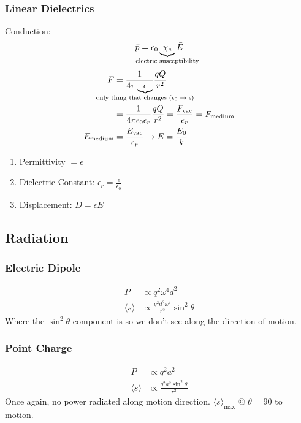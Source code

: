 \documentclass[10pt,letter]{article}
\begin{document}
\subsubsection{Linear Dielectrics}
Conduction:
\begin{equation}
 \bar{p} = \epsilon_0 \underbrace{\chi_e}_{\mathclap{\textrm{electric susceptibility}}} \bar{E}
\end{equation}
\begin{align}
 F &= \frac{1}{4 \pi \underbrace{\epsilon}_{\mathclap{\textrm{only thing that changes ($\epsilon_0 \rightarrow \epsilon$)}}}} \frac{qQ}{r^2}\\
 &= \frac{1}{4 \pi \epsilon_0 \epsilon_r} \frac{qQ}{r^2} = \frac{F_{\textrm{vac}}}{\epsilon_r} = F_{\textrm{medium}}\\
 E_{\textrm{medium}} &= \frac{E_{\textrm{vac}}}{\epsilon_r} \rightarrow E = \frac{E_0}{k}
\end{align}
\begin{enumerate}
    \item Permittivity $ = \epsilon$ 
    \item Dielectric Constant: $\epsilon_r = \frac{\epsilon}{\epsilon_0}$
    \item Displacement: $\bar{D} = \epsilon \bar{E}$
\end{enumerate}

\subsection{Radiation}
\subsubsection{Electric Dipole}
\begin{align}
 P &\propto q^2 \omega^4 d^2\\
\langle s \rangle &\propto \frac{q^2 d^2 \omega^4}{r^2}\sin^2\theta
\end{align}
Where the $\sin^2 \theta$ component is so we don't see along the direction of motion.

\subsubsection{Point Charge}
\begin{align}
 P &\propto q^2 a^2\\
 \langle s \rangle &\propto \frac{q^2 a^2  \sin^2\theta}{r^2}
\end{align}
Once again, no power radiated along motion direction. $\langle s \rangle_{\textrm{max}}$ @ $ \theta = 90$ to motion.
\end{document}
